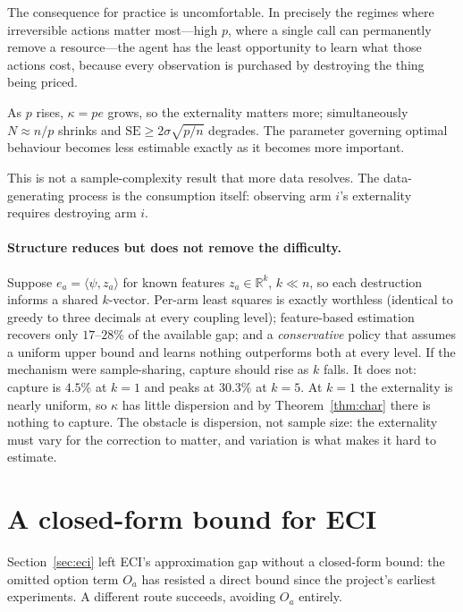 The consequence for practice is uncomfortable. In precisely the regimes where
irreversible actions matter most---high $p$, where a single call can permanently
remove a resource---the agent has the least opportunity to learn what those actions
cost, because every observation is purchased by destroying the thing being priced.

\begin{corollary}
As $p$ rises, $\kappa = p e$ grows, so the externality matters more; simultaneously
$N \approx n/p$ shrinks and $\mathrm{SE} \ge 2\sigma\sqrt{p/n}$ degrades. The
parameter governing optimal behaviour becomes less estimable exactly as it becomes
more important.
\end{corollary}

This is not a sample-complexity result that more data resolves. The data-generating
process is the consumption itself: observing arm $i$'s externality requires
destroying arm $i$.

\paragraph{Structure reduces but does not remove the difficulty.} Suppose $e_a = \langle \psi, z_a\rangle$
for known features $z_a \in \mathbb{R}^k$, $k \ll n$, so each destruction informs a
shared $k$-vector. Per-arm least squares is exactly worthless (identical to greedy
to three decimals at every coupling level); feature-based estimation recovers only
$17$--$28\%$ of the available gap; and a \emph{conservative} policy that assumes a
uniform upper bound and learns nothing outperforms both at every level. If the
mechanism were sample-sharing, capture should rise as $k$ falls. It does not:
capture is $4.5\%$ at $k=1$ and peaks at $30.3\%$ at $k=5$. At $k=1$ the
externality is nearly uniform, so $\kappa$ has little dispersion and by
Theorem~\ref{thm:char} there is nothing to capture. The obstacle is dispersion, not
sample size: the externality must vary for the correction to matter, and variation
is what makes it hard to estimate.

\section{A closed-form bound for ECI}
\label{sec:bound}

Section~\ref{sec:eci} left ECI's approximation gap without a closed-form bound: the
omitted option term $O_a$ has resisted a direct bound since the project's earliest
experiments. A different route succeeds, avoiding $O_a$ entirely.

